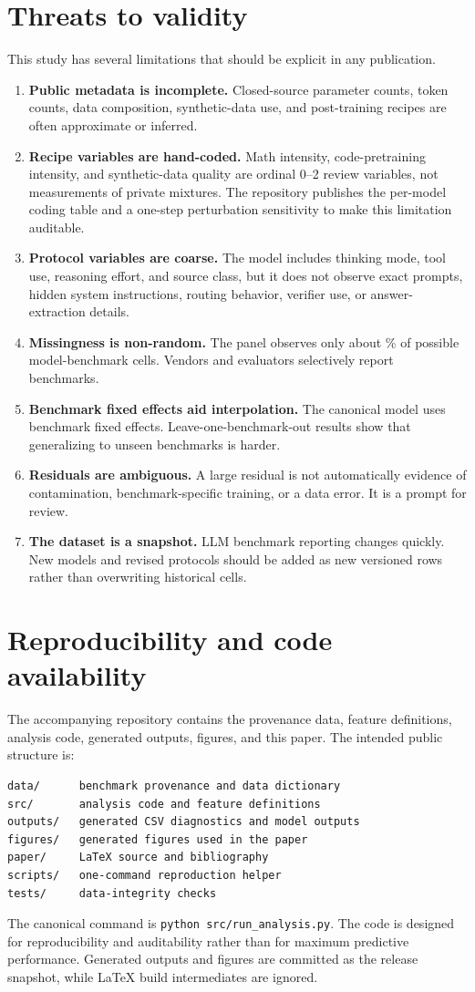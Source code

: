 \documentclass[11pt]{article}
\begin{document}
\section{Threats to validity}
This study has several limitations that should be explicit in any publication.
\begin{enumerate}[leftmargin=*]
\item \textbf{Public metadata is incomplete.} Closed-source parameter counts, token counts, data composition, synthetic-data use, and post-training recipes are often approximate or inferred.
\item \textbf{Recipe variables are hand-coded.} Math intensity, code-pretraining intensity, and synthetic-data quality are ordinal 0--2 review variables, not measurements of private mixtures. The repository publishes the per-model coding table and a one-step perturbation sensitivity to make this limitation auditable.
\item \textbf{Protocol variables are coarse.} The model includes thinking mode, tool use, reasoning effort, and source class, but it does not observe exact prompts, hidden system instructions, routing behavior, verifier use, or answer-extraction details.
\item \textbf{Missingness is non-random.} The panel observes only about \CoveragePct{}\% of possible model-benchmark cells. Vendors and evaluators selectively report benchmarks.
\item \textbf{Benchmark fixed effects aid interpolation.} The canonical model uses benchmark fixed effects. Leave-one-benchmark-out results show that generalizing to unseen benchmarks is harder.
\item \textbf{Residuals are ambiguous.} A large residual is not automatically evidence of contamination, benchmark-specific training, or a data error. It is a prompt for review.
\item \textbf{The dataset is a snapshot.} LLM benchmark reporting changes quickly. New models and revised protocols should be added as new versioned rows rather than overwriting historical cells.
\end{enumerate}

\section{Reproducibility and code availability}
The accompanying repository contains the provenance data, feature definitions, analysis code, generated outputs, figures, and this paper. The intended public structure is:
\begin{verbatim}
data/      benchmark provenance and data dictionary
src/       analysis code and feature definitions
outputs/   generated CSV diagnostics and model outputs
figures/   generated figures used in the paper
paper/     LaTeX source and bibliography
scripts/   one-command reproduction helper
tests/     data-integrity checks
\end{verbatim}
The canonical command is \texttt{python src/run\_analysis.py}. The code is designed for reproducibility and auditability rather than for maximum predictive performance. Generated outputs and figures are committed as the release snapshot, while LaTeX build intermediates are ignored.
\end{document}

